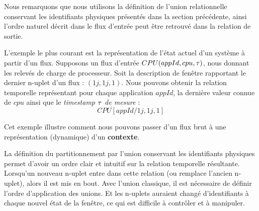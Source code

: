 Nous remarquons que nous utilisons la définition de l'union relationnelle conservant les identifiants physiques présentés dans la section précédente, ainsi l'ordre naturel décrit dans le flux d'entrée peut être retrouvé dans la relation de sortie.
\begin{example}
	L'exemple le plus courant est la représentation de l'état actuel d'un système à partir d'un flux. Supposons un flux d'entrée $CPU(appId,cpu,\tau)$, nous donnant les relevés de charge de processeur. Soit la description de fenêtre rapportant le dernier n-uplet d'un flux : $(1j,1j,1)$. Nous pouvons obtenir la relation temporelle représentant pour chaque application $appId$, la dernière valeur connue de $cpu$ ainsi que le \textit{timestamp $\tau$ de mesure} : $$CPU[appId/1j,1j,1]$$

	Cet exemple illustre comment nous pouvons passer d'un flux brut à une représentation (dynamique) d'un \textbf{contexte}. 
	
	La définition du partitionnement par l'union conservant les identifiants physiques permet d'avoir un ordre clair et intuitif sur la relation temporelle résultante. Lorsqu'un nouveau n-uplet entre dans cette relation (ou remplace l'ancien n-uplet), alors il est mis en bout. Avec l'union classique, il est nécessaire de définir l'ordre d'application des unions. Et les n-uplets auraient changé d'identifiants à chaque nouvel état de la fenêtre, ce qui est difficile à contrôler et à manipuler.
\end{example}

